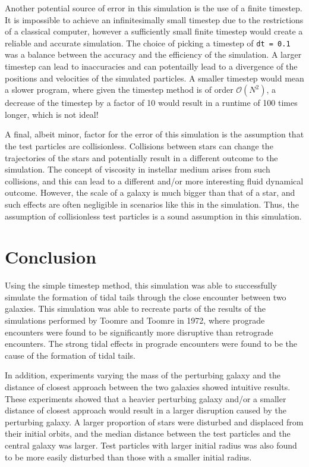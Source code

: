 \documentclass[twoside,twocolumn]{article}
\begin{document}
        Another potential source of error in this simulation is the use of a finite timestep. It is impossible to achieve an infinitesimally small timestep due to the restrictions of a classical computer, however a sufficiently small finite timestep would create a reliable and accurate simulation. The choice of picking a timestep of \texttt{dt = 0.1} was a balance between the accuracy and the efficiency of the simulation. A larger timestep can lead to inaccuracies and can potentailly lead to a divergence of the positions and velocities of the simulated particles. A smaller timestep would mean a slower program, where given the timestep method is of order $\mathcal{O}(N^2)$, a decrease of the timestep by a factor of 10 would result in a runtime of 100 times longer, which is not ideal!

        A final, albeit minor, factor for the error of this simulation is the assumption that the test particles are collisionless. Collisions between stars can change the trajectories of the stars and potentially result in a different outcome to the simulation. The concept of viscosity in instellar medium arises from such collisions, and this can lead to a different and/or more interesting fluid dynamical outcome. However, the scale of a galaxy is much bigger than that of a star, and such effects are often negligible in scenarios like this in the simulation. Thus, the assumption of collisionless test particles is a sound assumption in this simulation. 

\section{Conclusion}

        Using the simple timestep method, this simulation was able to successfully simulate the formation of tidal tails through the close encounter between two galaxies. This simulation was able to recreate parts of the results of the simulations performed by Toomre and Toomre in 1972, where prograde encounters were found to be significantly more disruptive than retrograde encounters. The strong tidal effects in prograde encounters were found to be the cause of the formation of tidal tails.

        In addition, experiments varying the mass of the perturbing galaxy and the distance of closest approach between the two galaxies showed intuitive results. These experiments showed that a heavier perturbing galaxy and/or a smaller distance of closest approach would result in a larger disruption caused by the perturbing galaxy. A larger proportion of stars were disturbed and displaced from their initial orbits, and the median distance between the test particles and the central galaxy was larger. Test particles with larger initial radius was also found to be more easily disturbed than those with a smaller initial radius.  
\end{document}
